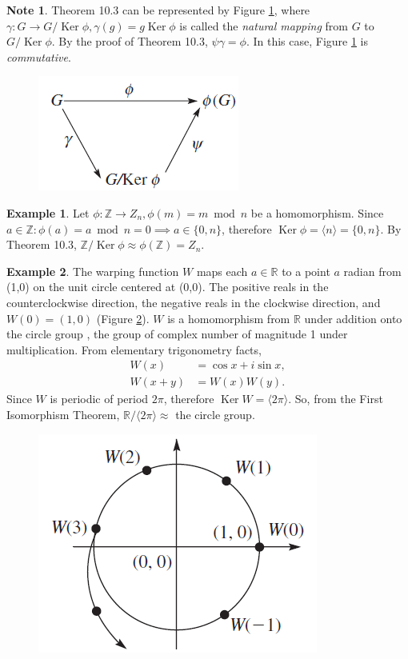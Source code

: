 \documentclass{article}
\theoremstyle{definition}
\newtheorem{example}{Example}[section]
\newtheorem{note}{Note}[section]
\DeclareMathOperator{\Ker}{Ker}
\begin{document}
    \begin{note}
       Theorem 10.3 can be represented by Figure \ref{thm10.3}, where $\gamma:G\to G/\Ker\phi, \gamma(g)=g\Ker\phi$ is called the \textit{natural mapping} from $G$ to $G/\Ker\phi$. By the proof of Theorem 10.3, $\psi\gamma=\phi$. In this case, Figure \ref{thm10.3} is \textit{commutative}.
       
       \begin{figure}[!htbp]
           \centering
           \includegraphics[width=0.35\linewidth]{figures/thm10.3.png}
           \caption{}
           \label{thm10.3}
       \end{figure}
    \end{note}
    
    \begin{example}
        Let $\phi:\mathbb{Z}\to Z_n, \phi(m)=m\bmod{n}$ be a homomorphism. Since $a\in\mathbb{Z}:\phi(a)=a\bmod{n}=0 \implies a\in\{0,n\}$, therefore $\Ker\phi=\langle n\rangle=\{0,n\}$. By Theorem 10.3, $\mathbb{Z}/\Ker\phi\approx\phi(\mathbb{Z})=Z_n$.
    \end{example}
    
    \begin{example}
        The warping function $W$ maps each $a\in\mathbb{R}$ to a point $a$ radian from (1,0) on the unit circle centered at (0,0). The positive reals in the counterclockwise direction, the negative reals in the clockwise direction, and $W(0)=(1,0)$ (Figure \ref{exp10.14}). $W$ is a homomorphism from $\mathbb{R}$ under addition onto the circle group , the group of complex number of magnitude 1 under multiplication. From elementary trigonometry facts,
        \begin{align*}
            W(x)&=\cos{x}+i\sin{x}, \\
            W(x+y)&=W(x)W(y).
        \end{align*}
        Since $W$ is periodic of period $2\pi$, therefore $\Ker W=\langle 2\pi\rangle$. So, from the First Isomorphism Theorem, $\mathbb{R}/\langle 2\pi\rangle \approx$ the circle group.
        
        \begin{figure}[!htbp]
            \centering
            \includegraphics[width=0.35\linewidth]{figures/exp10.14.png}
            \caption{}
            \label{exp10.14}
        \end{figure}
    \end{example}
    
\end{document}
